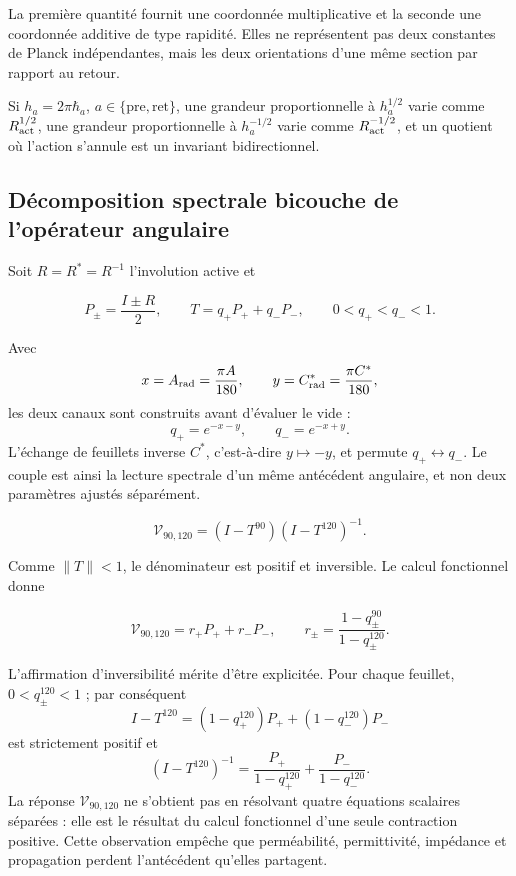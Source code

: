 La première quantité fournit une coordonnée multiplicative et la seconde
une coordonnée additive de type rapidité. Elles ne représentent pas deux constantes de
Planck indépendantes, mais les deux orientations d'une même section
par rapport au retour.

Si \(h_a=2\pi\hbar_a\), \(a\in\{\mathrm{pre},\mathrm{ret}\}\), une grandeur proportionnelle à \(h_a^{1/2}\) varie comme \(R_{\rm act}^{1/2}\), une grandeur proportionnelle à \(h_a^{-1/2}\) varie comme \(R_{\rm act}^{-1/2}\), et un quotient où l'action s'annule est un invariant bidirectionnel.

\subsection{Décomposition spectrale bicouche de l'opérateur angulaire}

Soit \(R=R^*=R^{-1}\) l'involution active et

\[
P_\pm=\frac{I\pm R}{2},
\qquad
T=q_+P_+ +q_-P_-,
\qquad 0<q_+<q_-<1.
\]

Avec
\[
x=A_{\rm rad}=\frac{\pi A}{180},\qquad
y=C^*_{\rm rad}=\frac{\pi C^*}{180},
\]
les deux canaux sont construits avant d'évaluer le vide :
\begin{equation}
q_+=e^{-x-y},\qquad q_-=e^{-x+y}.
\label{p12-83-c13-s1:eq:vacuum-angular-channels}
\end{equation}
L'échange de feuillets inverse \(C^*\), c'est-à-dire \(y\mapsto-y\), et permute \(q_+\leftrightarrow q_-\). Le couple est ainsi la lecture spectrale d'un même antécédent angulaire, et non deux paramètres ajustés séparément.

\begin{definition}
\begin{equation}
\mathcal V_{90,120}=(I-T^{90})(I-T^{120})^{-1}.
\label{p12-83-c13-s1:eq:vacuum-operator}
\end{equation}
\end{definition}

Comme \(\|T\|<1\), le dénominateur est positif et inversible. Le calcul fonctionnel donne

\begin{equation}
\mathcal V_{90,120}=r_+P_+ +r_-P_-,
\qquad
r_\pm=\frac{1-q_\pm^{90}}{1-q_\pm^{120}}.
\label{p12-83-c13-s1:eq:vacuum-eigenvalues}
\end{equation}

L'affirmation d'inversibilité mérite d'être explicitée. Pour chaque feuillet,
\(0<q_\pm^{120}<1\) ; par conséquent
\[
I-T^{120}=(1-q_+^{120})P_++(1-q_-^{120})P_-
\]
est strictement positif et
\[
(I-T^{120})^{-1}
=\frac{P_+}{1-q_+^{120}}+
 \frac{P_-}{1-q_-^{120}}.
\]
La réponse \(\mathcal V_{90,120}\) ne s'obtient pas en résolvant quatre
équations scalaires séparées : elle est le résultat du calcul fonctionnel d'une
seule contraction positive. Cette observation empêche que perméabilité,
permittivité, impédance et propagation perdent l'antécédent qu'elles partagent.

